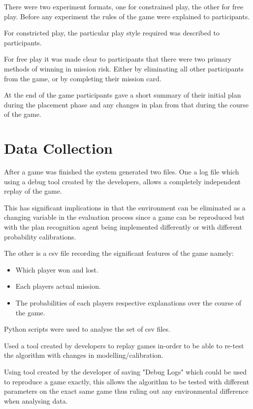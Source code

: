 \documentclass[parskip]{cs4rep}
\begin{document}
There were two experiment formats, one for constrained play, the other for free play. Before any experiment the rules of the game were explained to participants. 

For constricted play, the particular play style required was described to participants.

For free play it was made clear to participants that there were two primary methods of winning in mission risk. Either by eliminating all other participants from the game, or by completing their mission card.

At the end of the game participants gave a short summary of their initial plan during the placement phase and any changes in plan from that during the course of the game.

\section{Data Collection}

After a game was finished the system generated two files. One a log file which using a debug tool created by the developers, allows a completely independent replay of the game. 

This has significant implications in that the environment can be eliminated as a changing variable in the evaluation process since a game can be reproduced but with the plan recognition agent being implemented differently or with different probability calibrations. 

The other is a csv file recording the significant features of the game namely:

\begin{itemize}
\item
Which player won and lost.
\item
Each players actual mission.
\item
The probabilities of each players respective explanations over the course of the game.
\end{itemize}

Python scripts were used to analyse the set of csv files.

Used a tool created by developers to replay games in-order to be able to re-test the algorithm with changes in modelling/calibration.

Using tool created by the developer of saving "Debug Logs" which could be used to reproduce a game exactly, this allows the algorithm to be tested with different parameters on the exact same game thus ruling out any environmental difference when analysing data.
\end{document}
